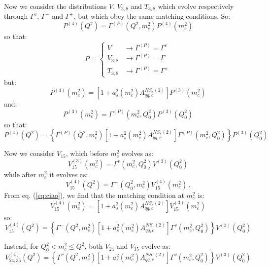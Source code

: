 \documentclass[10pt,a4paper]{article}
\begin{document}
Now we consider the distributions $V$, $V_{3,8}$ and $T_{3,8}$ which
evolve re\-spe\-cti\-ve\-ly through $\Gamma^v$, $\Gamma^-$ and
$\Gamma^+$, but which obey the same matching conditions. So:
\begin{equation}
P^{(4)}(Q^2)=\Gamma^{(P)}(Q^2,m_c^2)P^{(4)}(m_c^2)
\end{equation}
so that:
\begin{equation}
P=\left\{
\begin{array}{ll}
\displaystyle V &\rightarrow \Gamma^{(P)}=\Gamma^v\\
\displaystyle V_{3,8} &\rightarrow \Gamma^{(P)}=\Gamma^-\\
\displaystyle T_{3,8} &\rightarrow \Gamma^{(P)}=\Gamma^+
\end{array}\right.
\end{equation}
but:
\begin{equation}
P^{(4)}(m_c^2)=[1+a_s^2(m_c^2)A_{qq,c}^{N\!S,(2)}]P^{(3)}(m_c^2)
\end{equation}
and:
\begin{equation}
P^{(3)}(m_c^2)=\Gamma^{(P)}(m_c^2,Q_0^2)P^{(3)}(Q^2_0)
\end{equation}
so that:
\begin{equation}
P^{(4)}(Q^2)=\left\{\Gamma^{(P)}(Q^2,m_c^2)[1+a_s^2(m_c^2)A_{qq,c}^{N\!S,(2)}]\Gamma^{(P)}(m_c^2,Q_0^2)\right\}P^{(3)}(Q^2_0)
\end{equation}

Now we consider $V_{15}$, which before $m_c^2$ evolves as:
\begin{equation}
V_{15}^{(3)}(m_c^2)=\Gamma^{v}(m_c^2,Q_0^2)V^{(3)}(Q_0^2)
\end{equation}
while after $m_c^2$ it evolves as:
\begin{equation}
V_{15}^{(4)}(Q^2)=\Gamma^{-}(Q_0^2,m_c^2)V^{(4)}_{15}(m_c^2)\,.
\end{equation}
From eq. (\ref{eq:ciao}), we find that the matching condition at $m_c^2$ is:
\begin{equation}
V^{(4)}_{15}(m_c^2)=[1+a_s^2(m_c^2)A_{qq,c}^{N\!S,(2)}] V^{(3)}_{15}(m_c^2)
\end{equation}
so:
\begin{equation}
V_{15}^{(4)}(Q^2)=\left\{\Gamma^{-}(Q^2,m_c^2)[1+a_s^2(m_c^2)A_{qq,c}^{N\!S,(2)}]\Gamma^{v}(m_c^2,Q_0^2)\right\}V^{(3)}(Q_0^2)
\end{equation}

Instead, for $Q_0^2<m_c^2\leq Q^2$, both $V_{24}$ and $V_{35}$ evolve as: 
\begin{equation}
V_{24,35}^{(4)}(Q^2)=\left\{\Gamma^{v}(Q^2,m_c^2)[1+a_s^2(m_c^2)A_{qq,c}^{N\!S,(2)}]\Gamma^{v}(m_c^2,Q_0^2)\right\}V^{(3)}(Q_0^2)
\end{equation}
\end{document}
